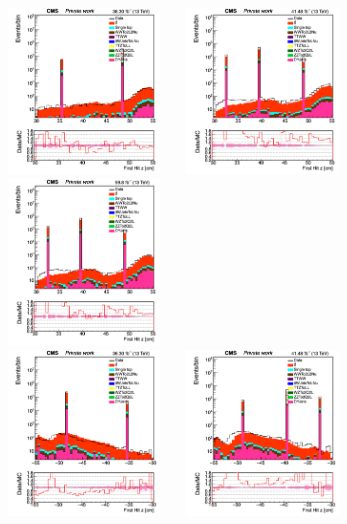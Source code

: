 \documentclass{cernatlasnote}
\begin{document}
  \begin{figure}[htp]
\centering
 \includegraphics[width=4.6cm, height=4.4cm]{images/emu_channel/2016/16_Plots_for_r_z/track_Track_firstHit_z_TRK_etaGT1p5_z30T55_Log.png}
\includegraphics[width=4.6cm, height=4.4cm]{images/emu_channel/2017/17_Plots_for_r_z/track_Track_firstHit_z_TRK_etaGT1p5_z30T55_Log.png}
 \includegraphics[width=4.6cm, height=4.4cm]{images/emu_channel/2018/18_Plots_for_r_z/track_Track_firstHit_z_TRK_etaGT1p5_z30T55_Log.png}\\
  \includegraphics[width=4.6cm, height=4.4cm]{images/emu_channel/2016/16_Plots_for_r_z/track_Track_firstHit_z_TRK_etaGT1p5_z30T55_minus_Log.png}
\includegraphics[width=4.6cm, height=4.4cm]{images/emu_channel/2017/17_Plots_for_r_z/track_Track_firstHit_z_TRK_etaGT1p5_z30T55_minus_Log.png}

\end{figure}
\end{document}
